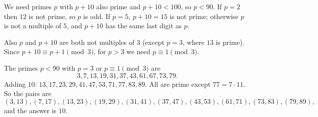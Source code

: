 We need primes $p$ with $p+10$ also prime and $p+10<100$, so $p<90$. If $p=2$ then $12$ is not prime, so $p$ is odd. If $p=5$, $p+10=15$ is not prime; otherwise $p$ is not a multiple of $5$, and $p+10$ has the same last digit as $p$.

Also $p$ and $p+10$ are both not multiples of $3$ (except $p=3$, where $13$ is prime). Since $p+10\equiv p+1\pmod 3$, for $p>3$ we need $p\equiv1\pmod3$.

The primes $p<90$ with $p=3$ or $p\equiv1\pmod 3$ are
\[
3,7,13,19,31,37,43,61,67,73,79 .
\]
Adding $10$: $13,17,23,29,41,47,53,71,77,83,89$. All are prime except $77=7\cdot11$. So the pairs are
\[
(3,13),(7,17),(13,23),(19,29),(31,41),(37,47),(43,53),(61,71),(73,83),(79,89),
\]
and the answer is $\boxed{10}$.
